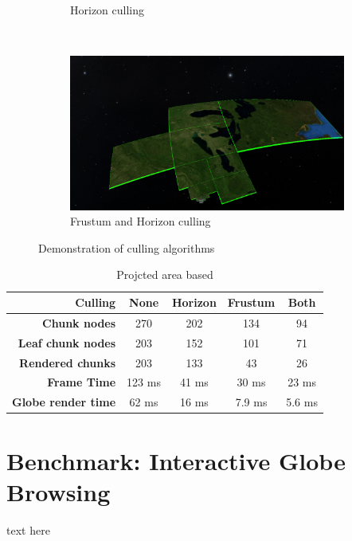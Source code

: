 \begin{figure}[h]
\begin{subfigure}[bt]{0.48\textwidth}
        \caption{Horizon culling}
    \end{subfigure}
    ~
    \begin{subfigure}[bt]{0.48\textwidth}
        \includegraphics[width=\textwidth]{figures/results/culling/afh.png}
        \caption{Frustum and Horizon culling}
    \end{subfigure}
    \caption{Demonstration of culling algorithms}
    \label{fig:cullinga}
\end{figure}

\begin{table}[h]
\centering
\caption[]{Projcted area based}
  \label{table:cullinga}
  \begin{tabular}{| r | c c c c |}
    \hline
      \textbf{Culling}            & \textbf{None} & \textbf{Horizon}  & \textbf{Frustum}  & \textbf{Both} \\ \hline
      \textbf{Chunk nodes}        & 270           & 202               & 134               & 94 \\ 
      \textbf{Leaf chunk nodes}   & 203           & 152               & 101               & 71 \\ 
      \textbf{Rendered chunks}    & 203           & 133               & 43                & 26 \\
      \textbf{Frame Time}         & 123 ms        & 41 ms             & 30 ms             & 23 ms \\
      \textbf{Globe render time}  & 62 ms         & 16 ms             & 7.9 ms            & 5.6 ms \\
    \hline
  \end{tabular}
\end{table}

\clearpage
\section{Benchmark: Interactive Globe Browsing}
\FloatBarrier
text here

